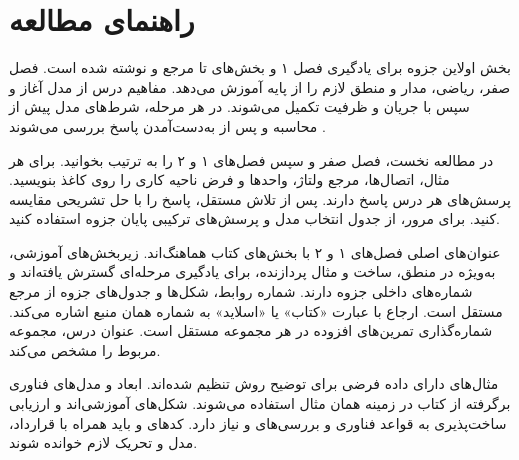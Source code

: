 \chapter*{راهنمای مطالعه}
{}
\begingroup
\setlength{\parskip}{0.2em}
\ifCompleteNotes بخش اول\else این جزوه\fi{} برای یادگیری فصل ۱ و بخش‌های  تا  مرجع
 و  نوشته شده است. فصل صفر، ریاضی، مدار و منطق لازم را
از پایه آموزش می‌دهد. مفاهیم درس از مدل  آغاز و سپس با جریان و ظرفیت
تکمیل می‌شوند. در هر مرحله، شرط‌های مدل پیش از محاسبه و پس از به‌دست‌آمدن پاسخ
بررسی می‌شوند \cite{weste,intro,mos}.

در مطالعه نخست، فصل صفر و سپس فصل‌های ۱ و ۲ را به ترتیب بخوانید.
برای هر مثال، اتصال‌ها، مرجع ولتاژ، واحدها و فرض ناحیه کاری را روی کاغذ بنویسید.
پرسش‌های هر درس پاسخ دارند. پس از تلاش مستقل، پاسخ را با حل تشریحی مقایسه کنید.
برای مرور، از جدول انتخاب مدل و پرسش‌های ترکیبی پایان جزوه استفاده کنید.

عنوان‌های اصلی فصل‌های ۱ و ۲ با بخش‌های کتاب هماهنگ‌اند.
زیربخش‌های آموزشی، به‌ویژه در منطق، ساخت و مثال پردازنده، برای یادگیری مرحله‌ای
گسترش یافته‌اند و شماره‌های داخلی جزوه دارند.
شماره روابط، شکل‌ها و جدول‌های جزوه از مرجع مستقل است.
ارجاع با عبارت «کتاب» یا «اسلاید» به شماره همان منبع اشاره می‌کند.
شماره‌گذاری تمرین‌های افزوده در هر مجموعه مستقل است. عنوان درس، مجموعه مربوط را مشخص می‌کند.

مثال‌های دارای داده فرضی برای توضیح روش تنظیم شده‌اند.
ابعاد و مدل‌های فناوری برگرفته از کتاب در زمینه همان مثال استفاده می‌شوند.
شکل‌های  آموزشی‌اند و ارزیابی ساخت‌پذیری به قواعد فناوری و
بررسی‌های  و  نیاز دارد.
کدهای  و  باید همراه با قرارداد، مدل و تحریک لازم خوانده شوند.

